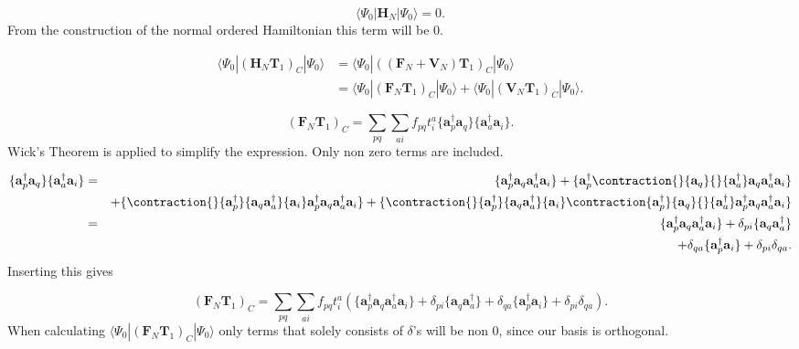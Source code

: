 \documentclass[graybox,sectrefs,envcountresetchap,open=right]{svmonodo}
\begin{document}
\begin{equation}
\langle \Psi_0 | \mathbf{H}_N | \Psi_0 \rangle = 0 .
\end{equation} 
From the construction of the normal ordered Hamiltonian this term will be 0.

\begin{align}
\langle \Psi_0 | (\mathbf{H}_N \mathbf{T}_1)_C | \Psi_0 \rangle & = \langle \Psi_0 | \left((\mathbf{F}_N + \mathbf{V}_N ) \mathbf{T}_1 \right)_C | \Psi_0 \rangle \nonumber \\ &
= \langle \Psi_0 | (\mathbf{F}_N \mathbf{T}_1)_C | \Psi_0 \rangle + \langle \Psi_0 | (\mathbf{V}_N \mathbf{T}_1)_C | \Psi_0 \rangle . \label{ene_1}
\end{align} 

\begin{equation}
(\mathbf{F}_N \mathbf{T}_1)_C  = \sum_{pq} \sum_{ai} f_{pq} t_i^a  \{ \mathbf{a}^{\dagger}_p \mathbf{a}_q\}  \{\mathbf{a}^{\dagger}_a \mathbf{a}_i \} . 
\end{equation} 
Wick's Theorem is applied to simplify the expression. Only non zero terms are included.

\begin{align}
\{ \mathbf{a}^{\dagger}_p \mathbf{a}_q\}  \{\mathbf{a}^{\dagger}_a \mathbf{a}_i \} & = &
\{ \mathbf{a}^{\dagger}_p \mathbf{a}_q \mathbf{a}^{\dagger}_a \mathbf{a}_i \} + \{ \mathbf{a}^{\dagger}_p
\contraction{}{\mathbf{a}_q}{}{\mathbf{a}^{\dagger}_a}
\mathbf{a}_q \mathbf{a}^{\dagger}_a
\mathbf{a}_i \}  \\ & &
+  \{
\contraction{}{\mathbf{a}^{\dagger}_p}{ \mathbf{a}_q \mathbf{a}^{\dagger}_a}{\mathbf{a}_i}
\mathbf{a}^{\dagger}_p \mathbf{a}_q \mathbf{a}^{\dagger}_a \mathbf{a}_i \} 
+ \{
\contraction{}{\mathbf{a}^{\dagger}_p}{\mathbf{a}_q \mathbf{a}^{\dagger}_a}{\mathbf{a}_i}
\contraction{\mathbf{a}^{\dagger}_p}{\mathbf{a}_q}{} {\mathbf{a}^{\dagger}_a}
\mathbf{a}^{\dagger}_p \mathbf{a}_q \mathbf{a}^{\dagger}_a \mathbf{a}_i \} \nonumber \\ & = &
\{ \mathbf{a}^{\dagger}_p \mathbf{a}_q \mathbf{a}^{\dagger}_a \mathbf{a}_i \} + \delta_{pi} \{\mathbf{a}_q \mathbf{a}_a^{\dagger} \} \nonumber \\ & &
+ \delta_{qa} \{\mathbf{a}_p^{\dagger} \mathbf{a}_i \} 
+ \delta_{pi} \delta_{qa} . \nonumber
\end{align} 
Inserting this gives 

\begin{equation}
(\mathbf{F}_N \mathbf{T}_1)_C = \sum_{pq} \sum_{ai} f_{pq} t_i^a \left(\{ \mathbf{a}^{\dagger}_p \mathbf{a}_q \mathbf{a}^{\dagger}_a \mathbf{a}_i \} + \delta_{pi} \{\mathbf{a}_q \mathbf{a}_a^{\dagger} \} 
+ \delta_{qa} \{\mathbf{a}_p^{\dagger} \mathbf{a}_i \} 
+ \delta_{pi} \delta_{qa} \right) .
\end{equation} 
When calculating $\langle \Psi_0 | (\mathbf{F}_N \mathbf{T}_1)_C | \Psi_0 \rangle$ only terms that solely consists of $\delta$'s will be non 0, since our basis is orthogonal. 
\end{document}
